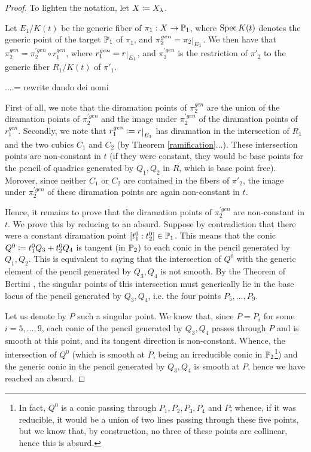 \documentclass[a4paper,12pt]{article}
\begin{document}
\begin{proof}
	To lighten the notation, let $X\defeq X_{\lambda}$.
	
	Let $E_1/K(t)$ be the generic fiber of $\pi_1:X \rightarrow \P_1$, where $\Spec K(t)$ denotes the generic point of the target $\P_1$ of $\pi_1$, and $\pi_2^{gen}=\restricts{\pi_2}{E_1}$. We then have that $\pi_2^{gen}= \pi_2^{\prime gen} \circ r_1^{gen}$, where $r_1^{gen}=\restricts{r}{E_1}$, and $\pi_2^{\prime gen}$ is the restriction of $\pi'_2$ to the generic fiber $R_1/K(t)$ of $\pi'_1$.
	
	....= rewrite dando dei nomi
	
	First of all, we note that the diramation points of $\pi_2^{gen}$ are the union of the diramation points of $\pi_2^{\prime gen}$ and the image under $\pi_2^{\prime gen}$ of the diramation points of $r_1^{gen}$. Secondly, we note that $r_1^{gen}\defeq\restricts{r}{E_1}$ has diramation in the intersection of $R_1$ and the two cubics $C_1$ and $C_2$ (by Theorem \ref{ramification}...). These intersection points are non-constant in $t$ (if they were constant, they would be base points for the pencil of quadrics generated by $Q_1,Q_2$ in $R$, which is base point free). Morover, since neither $C_1$ or $C_2$ are contained in the fibers of $\pi'_2$, the image under $\pi_2^{\prime gen}$ of these diramation points are again non-constant in $t$.
	
	Hence, it remains to prove that the diramation points of $\pi_2^{\prime gen}$ are non-constant in $t$. We prove this by reducing to an absurd. Suppose by contradiction that there were a constant diramation point $[t^0_1:t^0_2] \in \P_1$. This means that the conic $Q^0\defeq t_1^0Q_3+t_2^0Q_4$ is tangent (in $\P_2$) to each conic in the pencil generated by $Q_1,Q_2$. This is equivalent to saying that the intersection of $Q^0$ with the generic element of the pencil generated by $Q_3,Q_4$ is not smooth. By the Theorem of Bertini \cite[Remark 10.9.2]{hartshorne}, the singular points of this intersection must generically lie in the base locus of the pencil generated by $Q_3,Q_4$, i.e. the four points $P_5, \dots, P_9$. 
	
	Let us denote by $P$ such a singular point. We know that, since $P=P_i$ for some $i=5,\dots,9$, each conic of the pencil generated by $Q_3,Q_4$ passes through $P$ and is smooth at this point, and its tangent direction is non-constant. Whence, the intersection of $Q^0$ (which is smooth at $P$, being an irreducible conic in $\P_2$\footnote{In fact, $Q^0$ is a conic passing through $P_1,P_2,P_3,P_4$ and $P$; whence, if it was reducible, it would be a union of two lines passing through these five points, but we know that, by construction, no three of these points are collinear, hence this is absurd.}) and the generic conic in the pencil generated by $Q_3, Q_4$ is smooth at $P$, hence we have reached an absurd.
\end{proof}
\end{document}
